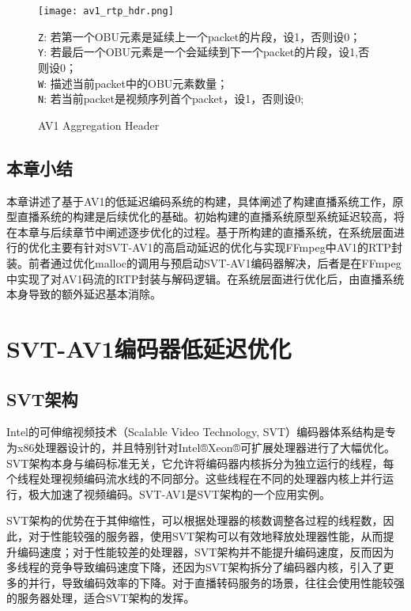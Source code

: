   \begin{figure}[!htp]
    \centering
    \texttt{[image: av1\_rtp\_hdr.png]} \\
    \raggedright
      \texttt{Z}: 若第一个OBU元素是延续上一个packet的片段，设1，否则设0；\\
      \texttt{Y}: 若最后一个OBU元素是一个会延续到下一个packet的片段，设1,否则设0；\\
      \texttt{W}: 描述当前packet中的OBU元素数量；\\
      \texttt{N}: 若当前packet是视频序列首个packet，设1，否则设0;\\
    \caption{AV1 Aggregation Header}
   \label{fig:av1rtp-aggr}
  \end{figure}

\section{本章小结}
  本章讲述了基于AV1的低延迟编码系统的构建，具体阐述了构建直播系统工作，原型直播系统的构建是后续优化的基础。初始构建的直播系统原型系统延迟较高，将在本章与后续章节中阐述逐步优化的过程。基于所构建的直播系统，在系统层面进行的优化主要有针对SVT-AV1的高启动延迟的优化与实现FFmpeg中AV1的RTP封装。前者通过优化malloc的调用与预启动SVT-AV1编码器解决，后者是在FFmpeg中实现了对AV1码流的RTP封装与解码逻辑。在系统层面进行优化后，由直播系统本身导致的额外延迟基本消除。


\chapter{SVT-AV1编码器低延迟优化}

\section{SVT架构}
  Intel的可伸缩视频技术（Scalable Video Technology, SVT）\cite{ScalableVideoTechnology2019}编码器体系结构是专为x86处理器设计的，并且特别针对Intel®Xeon®可扩展处理器进行了大幅优化。SVT架构本身与编码标准无关，它允许将编码器内核拆分为独立运行的线程，每个线程处理视频编码流水线的不同部分。这些线程在不同的处理器内核上并行运行，极大加速了视频编码。SVT-AV1是SVT架构的一个应用实例。

  SVT架构的优势在于其伸缩性，可以根据处理器的核数调整各过程的线程数，因此，对于性能较强的服务器，使用SVT架构可以有效地释放处理器性能，从而提升编码速度；对于性能较差的处理器，SVT架构并不能提升编码速度，反而因为多线程的竞争导致编码速度下降，还因为SVT架构拆分了编码器内核，引入了更多的并行，导致编码效率的下降。对于直播转码服务的场景，往往会使用性能较强的服务器处理，适合SVT架构的发挥。

